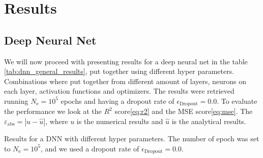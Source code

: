 \section{Results}
\subsection{Deep Neural Net}
We will now proceed with presenting results for a deep neural net in the table \ref{tab:dnn_general_results}, put together using different hyper parameters. Combinations where put together from different amount of layers, neurons on each layer, activation functions and optimizers. The results were retrieved running $N_\mathrm{e}=10^5$ epochs and having a dropout rate of $\epsilon_\mathrm{Dropout}=0.0$. To evaluate the performance we look at the $R^2$ score\eqref{eq:r2} and the MSE score\eqref{eq:mse}. The $\varepsilon_{\mathrm{abs}}=|u - \hat{u}|$, where $u$ is the numerical results and $\hat{u}$ is the analytical results.
\begin{table}[h!tb]
    \centering
    \caption{Results for a DNN with different hyper parameters. The number of epoch was set to $N_\mathrm{e}=10^5$, and we used a dropout rate of $\epsilon_\mathrm{Dropout}=0.0$.}
    \label{tab:dnn_general_results}
\end{table}


